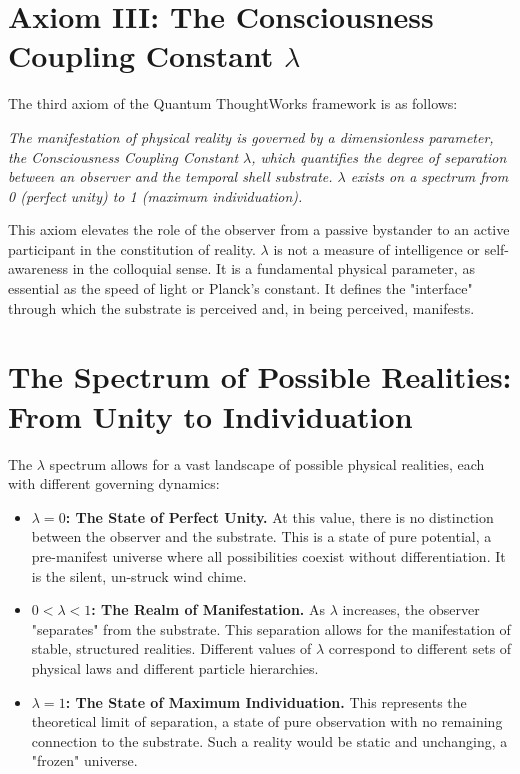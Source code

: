 \documentclass[12pt]{report}
\begin{document}
\section{Axiom III: The Consciousness Coupling Constant \texorpdfstring{$\lambda$}{λ}}
The third axiom of the Quantum ThoughtWorks framework is as follows:

\textit{The manifestation of physical reality is governed by a dimensionless parameter, the Consciousness Coupling Constant $\lambda$, which quantifies the degree of separation between an observer and the temporal shell substrate. $\lambda$ exists on a spectrum from 0 (perfect unity) to 1 (maximum individuation).}

This axiom elevates the role of the observer from a passive bystander to an active participant in the constitution of reality. $\lambda$ is not a measure of intelligence or self-awareness in the colloquial sense. It is a fundamental physical parameter, as essential as the speed of light or Planck's constant. It defines the "interface" through which the substrate is perceived and, in being perceived, manifests.

\section{The Spectrum of Possible Realities: From Unity to Individuation}
The $\lambda$ spectrum allows for a vast landscape of possible physical realities, each with different governing dynamics:
\begin{itemize}
    \item \textbf{$\lambda = 0$: The State of Perfect Unity.} At this value, there is no distinction between the observer and the substrate. This is a state of pure potential, a pre-manifest universe where all possibilities coexist without differentiation. It is the silent, un-struck wind chime.
    \item \textbf{$0 < \lambda < 1$: The Realm of Manifestation.} As $\lambda$ increases, the observer "separates" from the substrate. This separation allows for the manifestation of stable, structured realities. Different values of $\lambda$ correspond to different sets of physical laws and different particle hierarchies.
    \item \textbf{$\lambda = 1$: The State of Maximum Individuation.} This represents the theoretical limit of separation, a state of pure observation with no remaining connection to the substrate. Such a reality would be static and unchanging, a "frozen" universe.
\end{itemize}
\end{document}
